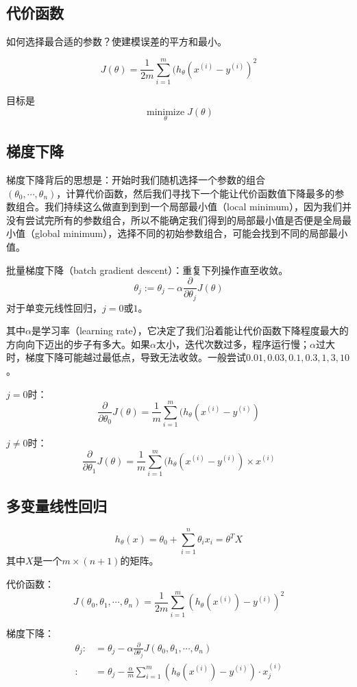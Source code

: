 \documentclass[cn,hazy,blue,normal,14pt]{elegantnote}
\begin{document}
\subsection{代价函数}
如何选择最合适的参数？使建模误差的平方和最小。

\begin{definition}[代价函数]
$$
J(\theta)=\frac{1}{2m}\sum_{i=1}^m(h_\theta(x^{(i)}-y^{(i)})^2
$$
\end{definition}

目标是
$$
\mathop{\text{minimize}}\limits_\theta J(\theta)
$$
\subsection{梯度下降}
梯度下降背后的思想是：开始时我们随机选择一个参数的组合\\$(\theta_0,\cdots,\theta_n)$，计算代价函数，然后我们寻找下一个能让代价函数值下降最多的参数组合。我们持续这么做直到到到一个局部最小值（local minimum），因为我们并没有尝试完所有的参数组合，所以不能确定我们得到的局部最小值是否便是全局最小值（global minimum），选择不同的初始参数组合，可能会找到不同的局部最小值。

批量梯度下降（batch gradient descent）：重复下列操作直至收敛。
$$
\theta_j:=\theta_j-\alpha \frac{\partial}{\partial \theta_j}J(\theta)
$$
对于单变元线性回归，$j=0$或$1$。

其中$\alpha$是学习率（learning rate），它决定了我们沿着能让代价函数下降程度最大的方向向下迈出的步子有多大。如果$\alpha$太小，迭代次数过多，程序运行慢；$\alpha$过大时，梯度下降可能越过最低点，导致无法收敛。一般尝试$0.01,0.03,0.1,0.3,1,3,10$。

$j=0$时：
$$
\frac{\partial}{\partial \theta_0}J(\theta)=\frac{1}{m}\sum_{i=1}^m(h_\theta(x^{(i)}-y^{(i)})
$$

$j\neq0$时：
$$
\frac{\partial}{\partial \theta_1}J(\theta)=\frac{1}{m}\sum_{i=1}^m(h_\theta(x^{(i)}-y^{(i)})\times x^{(i)}
$$
\subsection{多变量线性回归}
\begin{definition}[多变量线性回归模型]
$$
h_\theta(x)=\theta_0+\sum_{i=1}^n\theta_ix_i=\theta^TX
$$
其中$X$是一个$m\times(n+1)$的矩阵。
\end{definition}

\noindent 代价函数：
$$
J(\theta_0,\theta_1,\cdots,\theta_n)=\frac{1}{2m}\sum_{i=1}^{m}(h_\theta(x^{(i)})-y^{(i)})^2
$$

\noindent 梯度下降：
$$
\begin{aligned}
 \theta_j :&=\theta_j-\alpha\frac{\partial}{\partial \theta_j}J(\theta_0,\theta_1,\cdots,\theta_n) \\
:&=\theta_j-\frac{\alpha}{m}\sum_{i=1}^{m}(h_\theta(x^{(i)})-y^{(i)}) \cdot x_j^{(i)}   
\end{aligned}
$$
\newpage
\end{document}
